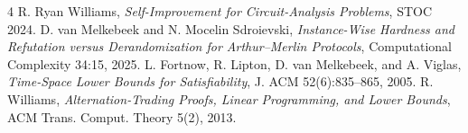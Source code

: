 \documentclass[11pt]{article}
\begin{document}
\begin{thebibliography}{4}
 R. Ryan Williams, \emph{Self-Improvement for Circuit-Analysis Problems}, STOC 2024.
 D. van Melkebeek and N. Mocelin Sdroievski, \emph{Instance-Wise Hardness and Refutation versus Derandomization for Arthur--Merlin Protocols}, Computational Complexity 34:15, 2025.
 L. Fortnow, R. Lipton, D. van Melkebeek, and A. Viglas, \emph{Time-Space Lower Bounds for Satisfiability}, J. ACM 52(6):835--865, 2005.
 R. Williams, \emph{Alternation-Trading Proofs, Linear Programming, and Lower Bounds}, ACM Trans. Comput. Theory 5(2), 2013.
\end{thebibliography}
\end{document}

